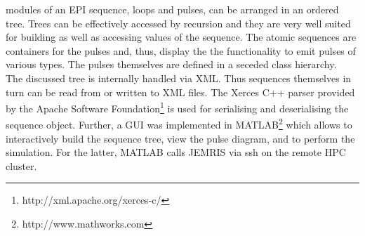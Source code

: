 \documentclass{nic-series}
\begin{document}
modules of an EPI sequence, loops and pulses, can be arranged in an
ordered tree. Trees can be effectively accessed by
recursion and they are very well suited for building as well as
accessing values of the sequence. The atomic sequences are containers
for the pulses and, thus, display the 
the functionality to emit pulses of various types. The pulses
themselves are defined in a seceded class hierarchy. 
\\
The discussed tree is internally handled via XML. Thus sequences
themselves in turn can be read from or written to XML files. 
The Xerces C++ parser provided by the Apache Software Foundation\footnote{\sf
http://xml.apache.org/xerces-c/} is used for serialising and
deserialising the sequence object. Further, a GUI was implemented in
MATLAB\footnote{\sf http://www.mathworks.com} which allows to
interactively build the sequence tree, view the pulse diagram, and to
perform the simulation. For the latter, MATLAB calls JEMRIS via {\sf
ssh} on the remote HPC cluster.
\end{document}
